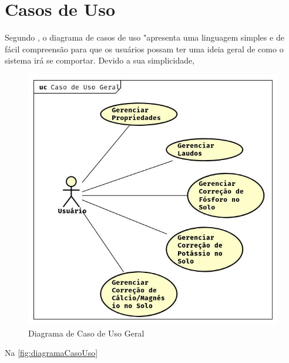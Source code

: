 \section{Casos de Uso}
\label{sec:titSecCasoUso}

Segundo \cite{guedes2018uml}, o diagrama de casos de uso "apresenta uma linguagem simples e de fácil compreensão para que os usuários possam ter uma ideia geral de como o sistema irá se comportar. Devido a sua simplicidade,

\begin{figure}[H]
    \centering
    \includegraphics[width=13cm]{./dados/analise/casouso.jpg}
    \caption{Diagrama de Caso de Uso Geral}
    \label{fig:diagramaCasoUso}
\end{figure}

Na \autoref{fig:diagramaCasoUso}